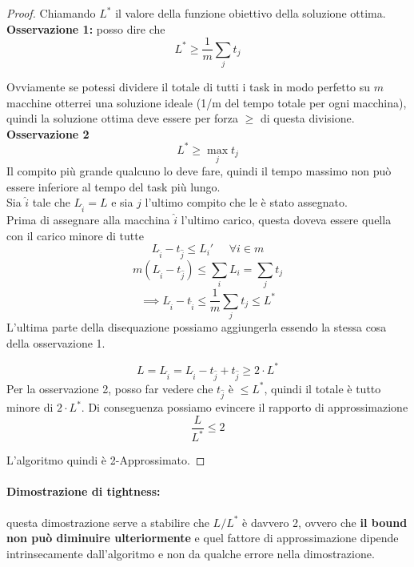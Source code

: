 \begin{proof}
	Chiamando $L^\ast$ il valore della funzione obiettivo della soluzione ottima. \\
	
	\textbf{Osservazione 1:} posso dire che 
	$$ L^\ast \geq \frac{1}{m} \sum_{j} t_j $$
	
	Ovviamente se potessi dividere il totale di tutti i task in modo perfetto su $m$ macchine otterrei una soluzione ideale (1/m del tempo totale per ogni macchina), quindi la soluzione ottima deve essere per forza $\geq$ di questa divisione.\\
	
	\textbf{Osservazione 2 }
	$$ L^\ast \geq \max_j t_j $$
	Il compito più grande qualcuno lo deve fare, quindi il tempo massimo non può essere inferiore al tempo del task più lungo.\\
	
	Sia $\hat{i}$ tale che $L_{\hat{i}} = L$ e sia $\hat{j}$ l'ultimo compito che le è stato assegnato.\\
	
	Prima di assegnare alla macchina $\hat{i}$ l'ultimo carico, questa doveva essere quella con il carico minore di tutte
	$$ L_{\hat{i}} - t_{\hat{j}} \leq L_i ' \;\;\;\;\; \forall i \in m $$
	$$ m (L_{\hat{i}} - t_{\hat{j}}) \leq \sum_i L_i = \sum_j t_j $$
	$$ \implies L_{\hat{i}} - t_{\hat{i}} \leq \frac{1}{m} \sum_j t_j \leq L^\ast $$
	L'ultima parte della disequazione possiamo aggiungerla essendo la stessa cosa della osservazione 1.
	
	$$ L = L_{\hat{i}} = L_{\hat{i}} - t_{\hat{j}} + t_{\hat{j}} \geq 2 \cdot L^\ast $$
	Per la osservazione 2, posso far vedere che $t_{\hat{j}}$ è $\leq L^\ast$, quindi il totale è tutto minore di $2 \cdot L^\ast$. Di conseguenza possiamo evincere il rapporto di approssimazione
	$$ \frac{L}{L^\ast} \leq 2 $$
	
	L'algoritmo quindi è 2-Approssimato.
\end{proof}

\newpage


\paragraph{Dimostrazione di tightness:} questa dimostrazione serve a stabilire che $L/L^\ast$ è davvero 2, ovvero che \textbf{il bound non può diminuire ulteriormente} e quel fattore di approssimazione dipende intrinsecamente dall'algoritmo e non da qualche errore nella dimostrazione.\\

